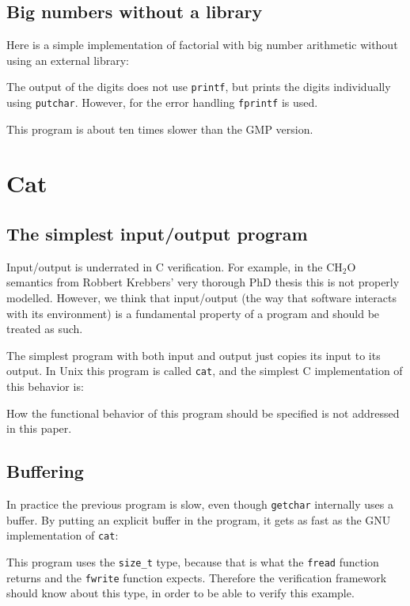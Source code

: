 \documentclass{article}
\begin{document}
\subsection{Big numbers without a library}
Here is a simple implementation of factorial with big number arithmetic without
using an external library:

The output of the digits does not use \texttt{printf}, but prints
the digits individually using \texttt{putchar}.
However, for the error handling \texttt{fprintf} is used.

This program is about ten times slower than the GMP version.

\section{Cat}

\subsection{The simplest input/output program}
Input/output is underrated in C verification.
For example, in the CH$_2$O semantics from Robbert Krebbers' very thorough PhD thesis \cite{kre:15} this
is not properly modelled.
However, we think that input/output (the way that
software interacts with its environment) is a fundamental property of a program
and should be treated as such.

The simplest program with both input and output just copies its input to its output.
In Unix this program is called \texttt{cat}, and the simplest C implementation of this behavior is:

How the functional behavior of this program should be {specified} is not addressed in this paper.

\subsection{Buffering}
In practice the previous program is slow, even though \texttt{getchar} internally uses a buffer.
By putting an explicit buffer in the program, it gets as fast as the GNU implementation of \texttt{cat}:

This program uses the \lstinline|size_t| type, because that is what the \lstinline|fread| function returns and the \lstinline|fwrite| function expects.
Therefore the verification framework should know about this type, in order to be able to verify this example.
\end{document}
